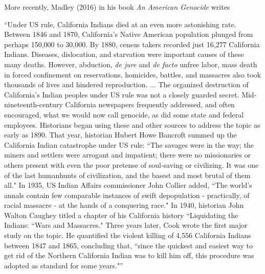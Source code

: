 More recently, Madley (2016) in his book \textsl{An American Genocide} writes 
\begin{myquote}
“Under US rule, California Indians died at an even more astonishing rate. Between 1846 and 1870, California's Native American population plunged from perhaps 150,000 to 30,000. By 1880, census takers recorded just 16,277 California Indians. Diseases, dislocation, and starvation were important causes of these many deaths. However, abduction, {\sl de jure} and {\sl de facto} unfree labor, mass death in forced confinement on reservations, homicides, battles, and massacres also took thousands of lives and hindered reproduction. $\ldots$ The organized destruction of California's Indian peoples under US rule was not a closely guarded secret. Mid-nineteenth-century California newspapers frequently addressed, and often encouraged, what we would now call genocide, as did some state and federal employees. Historians began using these and other sources to address the topic as early as 1890. That year, historian Hubert Howe Bancroft summed up the California Indian catastrophe under US rule: ``The savages were in the way; the miners and settlers were arrogant and impatient; there were no missionaries or others present with even the poor pretense of soul-saving or civilizing. It was one of the last humanhunts of civilization, and the basest and most brutal of them all." In 1935, US Indian Affairs commissioner John Collier added, ``The world's annals contain few comparable instances of swift depopulation - practically, of racial massacre - at the hands of a conquering race." In 1940, historian John Walton Caughey titled a chapter of his California history ``Liquidating the Indians: ``Wars and Massacres." Three years later, Cook wrote the first major study on the topic. He quantified the violent killing of 4,556 California Indians between 1847 and 1865, concluding that, ``since the quickest and easiest way to get rid of the Northern California Indian was to kill him off, this procedure was adopted as standard for some years."”
\end{myquote}

